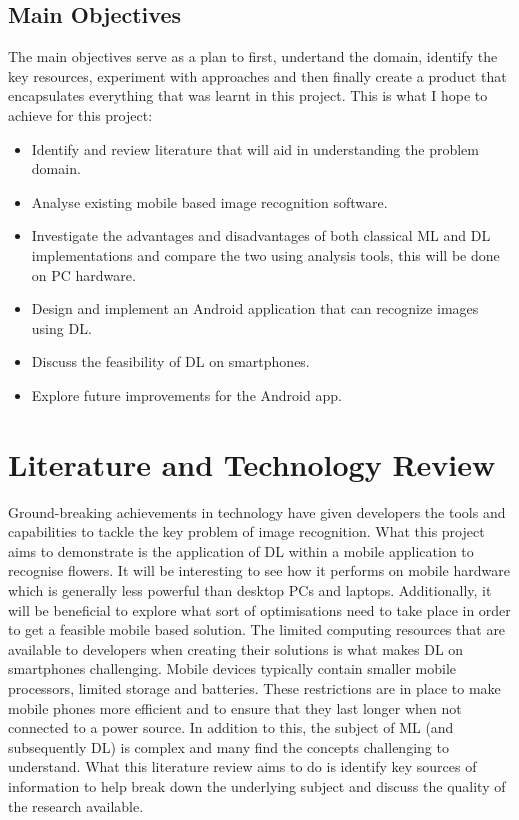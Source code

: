 \documentclass[12pt,a4paper]{report}
\begin{document}
\section{Main Objectives}
The main objectives serve as a plan to first, undertand the domain, 
identify the key resources, experiment with approaches and then finally create a product that encapsulates 
everything that was learnt in this project. This is what I hope to achieve for this project:
\begin{itemize}
    \item Identify and review literature that will aid in understanding the problem domain.
    \item Analyse existing mobile based image recognition software.
    \item Investigate the advantages and disadvantages of both classical ML and DL implementations and compare the two 
using analysis tools, this will be done on PC hardware.
    \item Design and implement an Android application that can recognize images using DL.
    \item Discuss the feasibility of DL on smartphones.
    \item Explore future improvements for the Android app.
\end{itemize}

\clearpage
\chapter{Literature and Technology Review}

Ground-breaking achievements in technology have given developers the tools and capabilities to
tackle the key problem of image recognition. What this project aims to demonstrate is the application of DL 
within a mobile application to recognise flowers. It will be interesting to see how it performs on mobile 
hardware which is generally less powerful than desktop PCs and laptops. Additionally, it will be beneficial to explore 
what sort 
of optimisations need to take place in order to get a feasible mobile based solution. The limited computing resources 
that are available to developers when creating their solutions is what makes DL on smartphones challenging. 
Mobile devices typically 
contain smaller mobile processors, limited storage and batteries. These restrictions are in place to 
make mobile phones more efficient and to ensure that they last longer when not connected to a power source. In addition
to this, the subject of ML (and subsequently DL) is complex and many find the concepts challenging to understand. 
What this literature review aims to do is identify key sources of information to help break down the underlying 
subject and discuss the quality of the research available.
\end{document}
